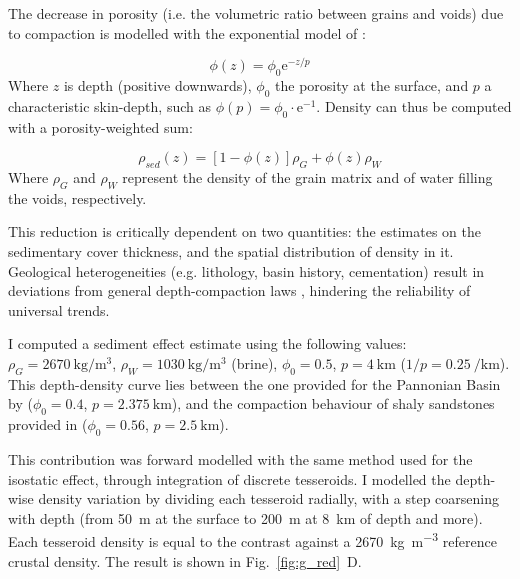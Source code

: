 The decrease in porosity (i.e. the volumetric ratio between grains and voids) due to compaction is modelled with the exponential model of \textcite{woodside1961}:

\begin{equation}
	\label{eq:ExpCompactionPhi}
	\phi(z) = \phi_0 \mathrm{e}^{-z/p}
\end{equation}
Where $z$ is depth (positive downwards), $\phi_0$ the porosity at the surface, and $p$ a characteristic skin-depth, such as $\phi(p) = \phi_0 \cdot \mathrm{e}^{-1}$.
Density can thus be computed with a porosity-weighted sum:

\begin{equation}
	\label{eq:ExpCompactionRho}
	\rho_{sed}(z) = [1-\phi(z)] \rho_{G} + \phi(z) \rho_{W}
\end{equation}
Where $\rho_{G}$ and $\rho_{W}$ represent the density of the grain matrix and of water filling the voids, respectively.

This reduction is critically dependent on two quantities: the estimates on the sedimentary cover thickness, and the spatial distribution of density in it.
Geological heterogeneities (e.g. lithology, basin history, cementation) result in deviations from general depth-compaction laws \parencite{allen2013basin}, hindering the reliability of universal trends.

I computed a sediment effect estimate using the following values: $\rho_G = \SI{2670}{\kilo \gram \per \cubic \metre}$, $\rho_W = \SI{1030}{\kilo \gram \per \cubic \metre}$ (brine), $\phi_0 = \num{0.5}$, $p = \SI{4}{\kilo \metre}$ ($1/p = \SI{0.25}{\per \kilo \metre}$).
This depth-density curve lies between the one provided for the Pannonian Basin by \textcite{Kaban2010} ($\phi_0 = \num{0.4}$, $p = \SI{2.375}{\kilo \metre}$), and the compaction behaviour of shaly sandstones provided in \parencite{allen2013basin} ($\phi_0 = \num{0.56}$, $p = \SI{2.5}{\kilo \metre}$).

This contribution was forward modelled with the same method used for the isostatic effect, through integration of discrete tesseroids.
I modelled the depth-wise density variation by dividing each tesseroid radially, with a step coarsening with depth (from 50~m at the surface to 200~m at 8~\si{\kilo \metre} of depth and more).
Each tesseroid density is equal to the contrast against a 2670~\si{\kilo \gram \per \cubic \metre} reference crustal density.
The result is shown in Fig.~\ref{fig:g_red}~D.

